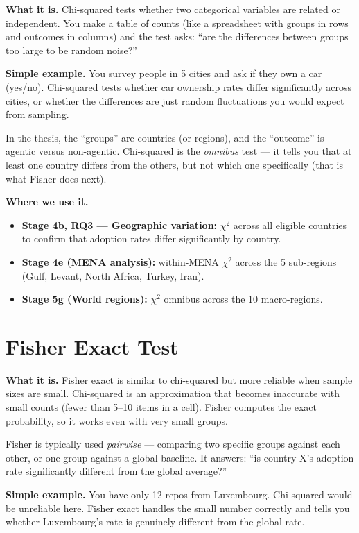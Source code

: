 \documentclass[11pt,a4paper]{article}
\begin{document}
\begin{conceptbox}
\textbf{What it is.}
Chi-squared tests whether two categorical variables are related or independent. You make a table
of counts (like a spreadsheet with groups in rows and outcomes in columns) and the test asks:
``are the differences between groups too large to be random noise?''

\medskip
\textbf{Simple example.}
You survey people in 5 cities and ask if they own a car (yes/no). Chi-squared tests whether
car ownership rates differ significantly across cities, or whether the differences are just
random fluctuations you would expect from sampling.

\medskip
In the thesis, the ``groups'' are countries (or regions), and the ``outcome'' is agentic
versus non-agentic. Chi-squared is the \emph{omnibus} test --- it tells you that at least one
country differs from the others, but not which one specifically (that is what Fisher does next).
\end{conceptbox}

\begin{wherebox}
\textbf{Where we use it.}
\begin{itemize}
  \item \textbf{Stage 4b, RQ3 --- Geographic variation:} $\chi^2$ across all eligible countries
        to confirm that adoption rates differ significantly by country.
  \item \textbf{Stage 4e (MENA analysis):} within-MENA $\chi^2$ across the 5 sub-regions
        (Gulf, Levant, North Africa, Turkey, Iran).
  \item \textbf{Stage 5g (World regions):} $\chi^2$ omnibus across the 10 macro-regions.
\end{itemize}
\end{wherebox}

\section{Fisher Exact Test}

\begin{conceptbox}
\textbf{What it is.}
Fisher exact is similar to chi-squared but more reliable when sample sizes are small.
Chi-squared is an approximation that becomes inaccurate with small counts (fewer than
5--10 items in a cell). Fisher computes the exact probability, so it works even with
very small groups.

\medskip
Fisher is typically used \emph{pairwise} --- comparing two specific groups against each other,
or one group against a global baseline. It answers: ``is country X's adoption rate
significantly different from the global average?''

\medskip
\textbf{Simple example.}
You have only 12 repos from Luxembourg. Chi-squared would be unreliable here. Fisher exact
handles the small number correctly and tells you whether Luxembourg's rate is genuinely
different from the global rate.
\end{conceptbox}
\end{document}
